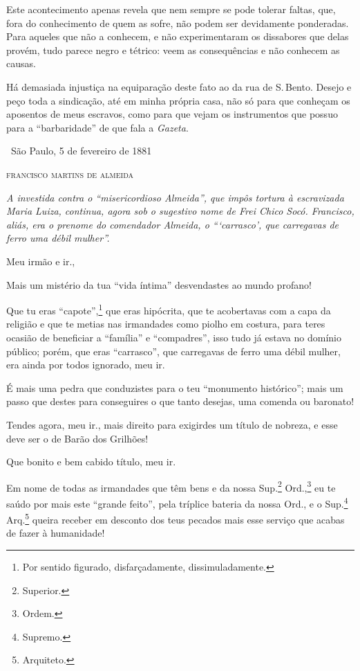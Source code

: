 {Este acontecimento apenas revela que nem sempre se pode tolerar faltas,
que, fora do conhecimento de quem as sofre, não podem ser devidamente
ponderadas. Para aqueles que não a conhecem, e não experimentaram os
dissabores que delas provém, tudo parece negro e tétrico: veem as
consequências e não conhecem as causas.

Há demasiada injustiça na equiparação deste fato ao da rua de S.\,Bento.
Desejo e peço toda a sindicação, até em minha própria casa, não só para
que conheçam os aposentos de meus escravos, como para que vejam os
instrumentos que possuo para a ``barbaridade'' de que fala a
\emph{Gazeta}.

\medskip
\hfill\ São Paulo, 5 de fevereiro de 1881

\hfill\textsc{francisco martins de almeida}


\begin{resumo}
\emph{A investida contra o ``misericordioso Almeida'', que impôs tortura à
escravizada Maria Luiza, continua, agora sob o sugestivo nome de Frei
Chico Socó. Francisco, aliás, era o prenome do comendador Almeida,
o ```carrasco', que carregavas de ferro uma débil mulher''.}
\end{resumo}

Meu irmão e ir., %

Mais um mistério da tua ``vida íntima'' desvendastes ao mundo profano!

Que tu eras ``capote'',\footnote{Por sentido figurado, disfarçadamente,
  dissimuladamente.} que eras hipócrita, que te acobertavas com a capa
da religião e que te metias nas irmandades como piolho em costura, para
teres ocasião de beneficiar a ``família'' e ``compadres'', isso tudo já
estava no domínio público; porém, que eras ``carrasco'', que carregavas de
ferro uma débil mulher, era ainda por todos ignorado, meu ir.

É mais uma pedra que conduzistes para o teu ``monumento histórico''; mais
um passo que destes para conseguires o que tanto desejas, uma comenda ou
baronato!

Tendes agora, meu ir., mais direito para exigirdes um título de
nobreza, e esse deve ser o de Barão dos Grilhões!

Que bonito e bem cabido título, meu ir.

Em nome de todas as irmandades que têm bens e da nossa Sup.\footnote{
  Superior.} Ord.,\footnote{Ordem.} eu te saúdo por mais este ``grande
feito'', pela tríplice bateria da nossa Ord., e o Sup.\footnote{
  Supremo.} Arq.\footnote{Arquiteto.}
queira receber em desconto
dos teus pecados mais esse serviço que acabas de fazer à humanidade!

}
